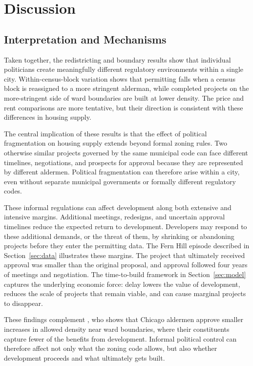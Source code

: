 \section{Discussion}
\label{sec:discussion}

\subsection{Interpretation and Mechanisms}
\label{subsec:interpretation_mechanisms}

Taken together, the redistricting and boundary results show that individual politicians create meaningfully different regulatory environments within a single city.
Within-census-block variation shows that permitting falls when a census block is reassigned to a more stringent alderman, while completed projects on the more-stringent side of ward boundaries are built at lower density.
The price and rent comparisons are more tentative, but their direction is consistent with these differences in housing supply.

The central implication of these results is that the effect of political fragmentation on housing supply extends beyond formal zoning rules.
Two otherwise similar projects governed by the same municipal code can face different timelines, negotiations, and prospects for approval because they are represented by different aldermen.
Political fragmentation can therefore arise within a city, even without separate municipal governments or formally different regulatory codes.

These informal regulations can affect development along both extensive and intensive margins.
Additional meetings, redesigns, and uncertain approval timelines reduce the expected return to development.
Developers may respond to these additional demands, or the threat of them, by shrinking or abandoning projects before they enter the permitting data.
The Fern Hill episode described in Section~\ref{sec:data} illustrates these margins.
The project that ultimately received approval was smaller than the original proposal, and approval followed four years of meetings and negotiation.
The time-to-build framework in Section~\ref{sec:model} captures the underlying economic force: delay lowers the value of development, reduces the scale of projects that remain viable, and can cause marginal projects to disappear.

These findings complement \citet{khan_decentralized_2021}, who shows that Chicago aldermen approve smaller increases in allowed density near ward boundaries, where their constituents capture fewer of the benefits from development.
Informal political control can therefore affect not only what the zoning code allows, but also whether development proceeds and what ultimately gets built.

